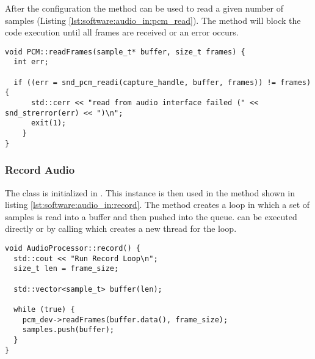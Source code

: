 %
\newpage\noindent
After the configuration the method  can be used to read a given number of samples (Listing \ref{lst:software:audio_in:pcm_read}). The method will block the code execution until all frames are received or an error occurs.
%
\begin{mdframed}
\begin{lstlisting}[caption=Method for reading frames from an ALSA device, label=lst:software:audio_in:pcm_read]
void PCM::readFrames(sample_t* buffer, size_t frames) {
  int err;

  if ((err = snd_pcm_readi(capture_handle, buffer, frames)) != frames) {
      std::cerr << "read from audio interface failed (" << snd_strerror(err) << ")\n";
      exit(1);
    }
}
  \end{lstlisting}
\end{mdframed}
%
\subsubsection*{Record Audio}
%
The  class is initialized in . This instance is then used in the method  shown in listing \ref{lst:software:audio_in:record}. The method creates a loop in which a set of samples is read into a buffer and then pushed into the  queue.  can be executed directly or by calling  which creates a new thread for the loop.

\begin{mdframed}
\begin{lstlisting}[caption=Record loop, label=lst:software:audio_in:record]
void AudioProcessor::record() {
  std::cout << "Run Record Loop\n";
  size_t len = frame_size;

  std::vector<sample_t> buffer(len);

  while (true) {
    pcm_dev->readFrames(buffer.data(), frame_size);
    samples.push(buffer);
  }
}
\end{lstlisting}
\end{mdframed}